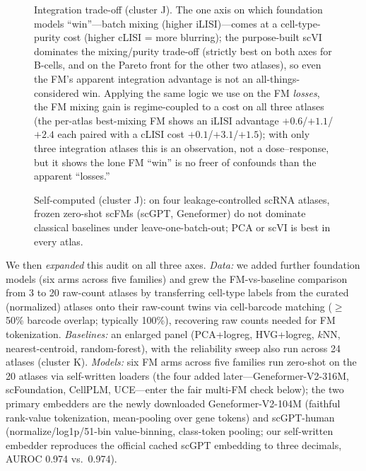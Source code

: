 \documentclass[fleqn,10pt,lineno]{wlpeerj}  %
\newcommand{\fitfig}[1]{\resizebox{\ifdim\width>\linewidth\linewidth\else\width\fi}{!}{#1}}
\begin{document}
\begin{figure}[htb]\centering\fitfig{}
\caption{Integration trade-off (cluster J). The one axis on which foundation models ``win''---batch mixing (higher iLISI)---comes at a cell-type-purity cost (higher cLISI = more blurring); the purpose-built scVI dominates the mixing/purity trade-off (strictly best on both axes for B-cells, and on the Pareto front for the other two atlases), so even the FM's apparent integration advantage is not an all-things-considered win. Applying the same logic we use on the FM \emph{losses}, the FM mixing gain is regime-coupled to a cost on all three atlases (the per-atlas best-mixing FM shows an iLISI advantage $+0.6$/$+1.1$/$+2.4$ each paired with a cLISI cost $+0.1$/$+3.1$/$+1.5$); with only three integration atlases this is an observation, not a dose--response, but it shows the lone FM ``win'' is no freer of confounds than the apparent ``losses.''}\label{fig:integ}\end{figure}

\begin{figure}[htb]\centering\fitfig{}
\caption{Self-computed (cluster J): on four leakage-controlled scRNA atlases, frozen zero-shot scFMs (scGPT, Geneformer) do not dominate classical baselines under leave-one-batch-out; PCA or scVI is best in every atlas.}\label{fig:scrnalobo}\end{figure}

We then \emph{expanded} this audit on all three axes. \emph{Data:} we added further foundation models (six arms across five families) and grew the FM-vs-baseline comparison from 3 to 20 raw-count atlases by transferring cell-type labels from the curated (normalized) atlases onto their raw-count twins via cell-barcode matching ($\geq$50\% barcode overlap; typically 100\%), recovering raw counts needed for FM tokenization. \emph{Baselines:} an enlarged panel (PCA+logreg, HVG+logreg, $k$NN, nearest-centroid, random-forest), with the reliability sweep also run across 24 atlases (cluster K). \emph{Models:} six FM arms across five families run zero-shot on the 20 atlases via self-written loaders (the four added later---Geneformer-V2-316M, scFoundation, CellPLM, UCE---enter the fair multi-FM check below); the two primary embedders are the newly downloaded Geneformer-V2-104M (faithful rank-value tokenization, mean-pooling over gene tokens) and scGPT-human (normalize/log1p/51-bin value-binning, class-token pooling; our self-written embedder reproduces the official cached scGPT embedding to three decimals, AUROC 0.974 vs.\ 0.974).
\end{document}
